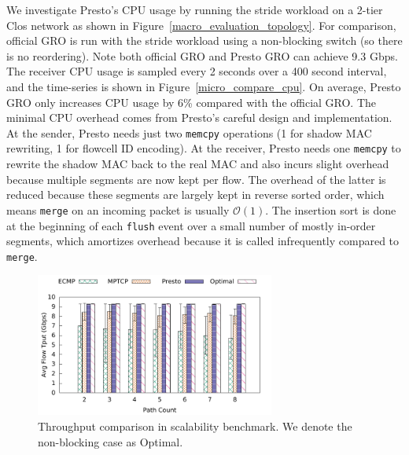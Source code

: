 We investigate Presto's CPU usage by
running the stride workload on a 2-tier Clos network as shown in Figure~\ref{macro_evaluation_topology}. 
For comparison, official GRO is run with the stride workload using a non-blocking switch (so there
is no reordering). Note both official GRO and Presto GRO can achieve 9.3 Gbps.  
The receiver CPU usage is sampled every 2 seconds over a 400 second interval, and
the time-series is shown in Figure~\ref{micro_compare_cpu}. 
On average, Presto GRO only increases CPU usage by 6\% compared with the official GRO. 
The minimal CPU overhead comes from Presto's careful design and implementation. 
At the sender, Presto needs just two {\tt memcpy} operations (1 for shadow MAC rewriting, 1 for flowcell ID encoding). 
At the receiver, Presto needs one {\tt memcpy} to rewrite the shadow MAC back to the real MAC and
also incurs slight overhead because multiple segments are now kept per flow. The overhead
of the latter is reduced because these segments are largely kept in reverse sorted order, which means {\tt merge}
on an incoming packet is usually $\mathcal{O}(1)$. The insertion sort is done at the beginning of each {\tt flush} event over a small
number of mostly in-order segments, which amortizes overhead because it is called infrequently compared to {\tt merge}.

\begin{figure}[!t]
        \centering
  \includegraphics[width=0.7\textwidth]{presto/figures/scalability_test/scalability_compare_tput_witherrbar.pdf}
        \caption{Throughput comparison in scalability benchmark. We denote the non-blocking case as Optimal. 
		} 
        \label{micro_scalability_test_tput}
\end{figure}

